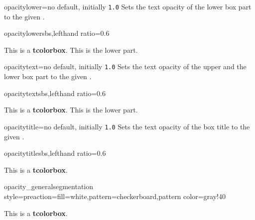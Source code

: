 \begin{docTcbKey}{opacitylower}{=}{no default, initially \texttt{1.0}}
  Sets the text opacity of the lower box part to the given .
\begin{exdispExample*}{opacitylower}{sbs,lefthand ratio=0.6}
\begin{tcolorbox}[enhanced,opacitylower=0.5,
  interior style={preaction={fill=white},pattern=checkerboard,pattern color=gray!40}]
This is a \textbf{tcolorbox}.
\tcblower
This is the lower part.
\end{tcolorbox}
\end{exdispExample*}
\end{docTcbKey}

\begin{docTcbKey}{opacitytext}{=}{no default, initially \texttt{1.0}}
  Sets the text opacity of the upper and the lower box part to the given .
\begin{exdispExample*}{opacitytext}{sbs,lefthand ratio=0.6}
\begin{tcolorbox}[enhanced,opacitytext=0.5,
  interior style={preaction={fill=white},pattern=checkerboard,pattern color=gray!40}]
This is a \textbf{tcolorbox}.
\tcblower
This is the lower part.
\end{tcolorbox}
\end{exdispExample*}
\end{docTcbKey}


\begin{docTcbKey}{opacitytitle}{=}{no default, initially \texttt{1.0}}
  Sets the text opacity of the box title to the given .
\begin{exdispExample*}{opacitytitle}{sbs,lefthand ratio=0.6}
\begin{tcolorbox}[enhanced,opacitytitle=0.7,
  coltitle=black,
  fonttitle=\bfseries,title=This is a title,
  title style={preaction={fill=white},pattern=checkerboard,pattern color=gray!40}]
This is a \textbf{tcolorbox}.
\end{tcolorbox}
\end{exdispExample*}
\end{docTcbKey}


\begin{exdispExample*}{opacity_general}{segmentation style={preaction={fill=white},pattern=checkerboard,pattern color=gray!40}}
\begin{tcolorbox}[enhanced jigsaw,fonttitle=\bfseries,title=This is a title,
  opacityframe=0.5,opacityback=0.25,opacitybacktitle=0.25,opacitytext=0.8,
  colback=red!5!white,colframe=red!75!black,colbacktitle=yellow!20!red]
This is a \textbf{tcolorbox}.
\end{tcolorbox}
\end{exdispExample*}



